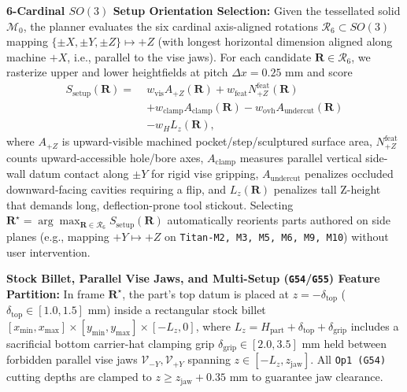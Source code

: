 \documentclass[conference]{IEEEtran}
\begin{document}
\textbf{6-Cardinal $SO(3)$ Setup Orientation Selection:}
Given the tessellated solid $\mathcal{M}_0$, the planner evaluates the six cardinal axis-aligned rotations $\mathcal{R}_6 \subset SO(3)$ mapping $\{\pm X, \pm Y, \pm Z\} \mapsto +Z$ (with longest horizontal dimension aligned along machine $+X$, i.e., parallel to the vise jaws). For each candidate $\mathbf{R} \in \mathcal{R}_6$, we rasterize upper and lower heightfields at pitch $\Delta x = 0.25\text{ mm}$ and score
\begin{equation}
  \begin{aligned}
    S_{\text{setup}}(\mathbf{R}) =\;& w_{\text{vis}} A_{+Z}(\mathbf{R}) + w_{\text{feat}} N_{+Z}^{\text{feat}}(\mathbf{R}) \\
    &+ w_{\text{clamp}} A_{\text{clamp}}(\mathbf{R}) - w_{\text{ovh}} A_{\text{undercut}}(\mathbf{R}) \\
    &- w_H L_z(\mathbf{R}),
  \end{aligned}
  \label{eq:setup_score}
\end{equation}
where $A_{+Z}$ is upward-visible machined pocket/step/sculptured surface area, $N_{+Z}^{\text{feat}}$ counts upward-accessible hole/bore axes, $A_{\text{clamp}}$ measures parallel vertical side-wall datum contact along $\pm Y$ for rigid vise gripping, $A_{\text{undercut}}$ penalizes occluded downward-facing cavities requiring a flip, and $L_z(\mathbf{R})$ penalizes tall Z-height that demands long, deflection-prone tool stickout. Selecting $\mathbf{R}^\star = \arg\max_{\mathbf{R} \in \mathcal{R}_6} S_{\text{setup}}(\mathbf{R})$ automatically reorients parts authored on side planes (e.g., mapping $+Y \mapsto +Z$ on \texttt{Titan-M2, M3, M5, M6, M9, M10}) without user intervention.

\textbf{Stock Billet, Parallel Vise Jaws, and Multi-Setup (\texttt{G54}/\texttt{G55}) Feature Partition:}
In frame $\mathbf{R}^\star$, the part's top datum is placed at $z = -\delta_{\text{top}}$ ($\delta_{\text{top}} \in [1.0, 1.5]\text{ mm}$) inside a rectangular stock billet $[x_{\min}, x_{\max}] \times [y_{\min}, y_{\max}] \times [-L_z, 0]$, where $L_z = H_{\text{part}} + \delta_{\text{top}} + \delta_{\text{grip}}$ includes a sacrificial bottom carrier-hat clamping grip $\delta_{\text{grip}} \in [2.0, 3.5]\text{ mm}$ held between forbidden parallel vise jaws $\mathcal{V}_{-Y}, \mathcal{V}_{+Y}$ spanning $z \in [-L_z, z_{\text{jaw}}]$. All \texttt{Op1 (G54)} cutting depths are clamped to $z \ge z_{\text{jaw}} + 0.35\text{ mm}$ to guarantee jaw clearance.
\end{document}
